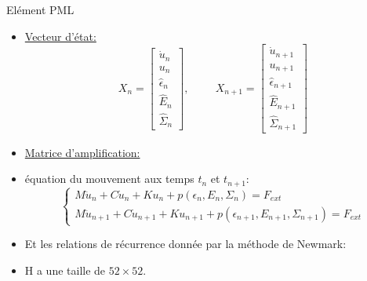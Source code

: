 \begin{frame}{Elément PML}
\begin{itemize}
\item \underline{Vecteur d'état:}
\begin{equation}
X_n = \begin{bmatrix}
\dot{u}_n \\
u_n \\
\hat{\epsilon}_{n} \\
\hat{E}_{n} \\
\hat{\Sigma}_{n}
\end{bmatrix}, \hspace{1cm}
X_{n+1}= \begin{bmatrix}
\dot{u}_{n+1} \\
u_{n+1} \\
\hat{\epsilon}_{n+1} \\
\hat{E}_{n+1} \\
\hat{\Sigma}_{n+1}
\end{bmatrix}
\end{equation} 

\item \underline{Matrice d'amplification: }
\item équation du mouvement aux temps $t_{n}$ et $t_{n+1}$:
\begin{equation}
\begin{cases}
    M \ddot{u}_n + C \dot{u}_n 
+K u_n + p(\epsilon_{n},E_{n},\Sigma_{n}) = F_{ext} \\
    M \ddot{u}_{n+1} +C \dot{u}_{n+1} 
+K u_{n+1} + p(\epsilon_{n+1},E_{n+1},\Sigma_{n+1}) = F_{ext}
\end{cases}
\end{equation}
\item Et les relations de récurrence donnée par la méthode de Newmark:
\item H a une taille de $52 \times 52$.
\end{itemize}
\end{frame}




